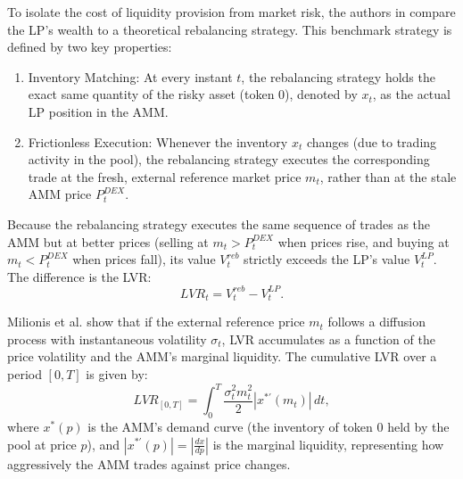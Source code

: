 \documentclass[11pt]{article}
\begin{document}
To isolate the cost of liquidity provision from market risk, the authors in \cite{milionis2023} compare the LP's wealth 
to a theoretical rebalancing strategy. This benchmark strategy is defined by two key properties:
\begin{enumerate}
    \item Inventory Matching: At every instant $t$, the rebalancing strategy holds the exact same quantity of the risky asset (token 0), denoted by $x_t$, as the actual LP position in the AMM.
    \item Frictionless Execution: Whenever the inventory $x_t$ changes (due to trading activity in the pool), the rebalancing strategy executes the corresponding trade at the fresh, external reference market price $m_t$, rather than at the stale AMM price $P^{DEX}_t$.
\end{enumerate}
Because the rebalancing strategy executes the same sequence of trades as the AMM but at better prices (selling at $m_t > P^{DEX}_t$ when prices rise, and buying at $m_t < P^{DEX}_t$ when prices fall), its value $V^{reb}_t$ strictly exceeds the LP's value $V^{LP}_t$. The difference is the LVR:
\begin{equation}
    LVR_t = V^{reb}_t - V^{LP}_t.
\end{equation}


Milionis et al. \cite{milionis2023} show that if the external reference price $m_t$ follows a diffusion process with 
instantaneous volatility $\sigma_t$, LVR accumulates as a function of the price volatility and the AMM's marginal liquidity. 
The cumulative LVR over a period $[0, T]$ is given by:
\begin{equation}
    LVR_{[0, T]} = \int_0^T \frac{\sigma_t^2 m_t^2}{2} |x^{*\prime}(m_t)| \, dt,
    \label{eq:lvr_general}
\end{equation}
where $x^*(p)$ is the AMM's demand curve (the inventory of token 0 held by the pool at price $p$), and $|x^{*\prime}(p)| = |\frac{dx}{dp}|$ is the marginal liquidity, representing how aggressively the AMM trades against price changes.
\end{document}
